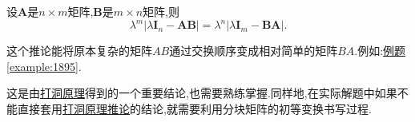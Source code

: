 \documentclass[../../main.tex]{subfiles}%
\begin{document}
\begin{corollary}[打洞原理推论]\label{corollary:打洞原理推论}
设\(\boldsymbol{A}\)是\(n\times m\)矩阵,\(\boldsymbol{B}\)是\(m\times n\)矩阵,则
\[
\lambda^{m}|\lambda\boldsymbol{I}_{n}-\boldsymbol{AB}|=\lambda^{n}|\lambda\boldsymbol{I}_{m}-\boldsymbol{BA}|.
\]
\end{corollary}
\begin{note}
这个推论能将原本复杂的矩阵$AB$通过交换顺序变成相对简单的矩阵$BA$.例如:\hyperref[example:1895]{例题\ref{example:1895}}.
\end{note}
\begin{remark}
这是由\hyperref[proposition:打洞原理]{打洞原理}得到的一个重要结论,也需要熟练掌握.同样地,在实际解题中如果不能直接套用\hyperref[corollary:打洞原理推论]{打洞原理推论}的结论,就需要利用分块矩阵的初等变换书写过程.
\end{remark}
\end{document}
